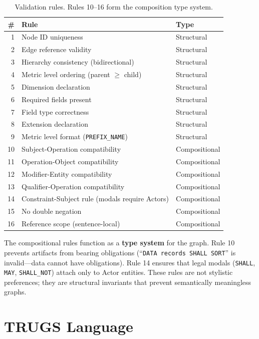 \documentclass{article}
\begin{document}
\begin{table}[h]
\centering
\caption{Validation rules. Rules 10--16 form the composition type system.}
\label{tab:rules}
\begin{tabular}{rll}
\toprule
\textbf{\#} & \textbf{Rule} & \textbf{Type} \\
\midrule
1 & Node ID uniqueness & Structural \\
2 & Edge reference validity & Structural \\
3 & Hierarchy consistency (bidirectional) & Structural \\
4 & Metric level ordering (parent $\geq$ child) & Structural \\
5 & Dimension declaration & Structural \\
6 & Required fields present & Structural \\
7 & Field type correctness & Structural \\
8 & Extension declaration & Structural \\
9 & Metric level format (\texttt{PREFIX\_NAME}) & Structural \\
\midrule
10 & Subject-Operation compatibility & Compositional \\
11 & Operation-Object compatibility & Compositional \\
12 & Modifier-Entity compatibility & Compositional \\
13 & Qualifier-Operation compatibility & Compositional \\
14 & Constraint-Subject rule (modals require Actors) & Compositional \\
15 & No double negation & Compositional \\
16 & Reference scope (sentence-local) & Compositional \\
\bottomrule
\end{tabular}
\end{table}

The compositional rules function as a \textbf{type system} for the graph. Rule 10 prevents artifacts from bearing obligations (``\texttt{DATA records SHALL SORT}'' is invalid---data cannot have obligations). Rule 14 ensures that legal modals (\texttt{SHALL}, \texttt{MAY}, \texttt{SHALL\_NOT}) attach only to Actor entities. These rules are not stylistic preferences; they are structural invariants that prevent semantically meaningless graphs.

\section{TRUGS Language}
\end{document}
